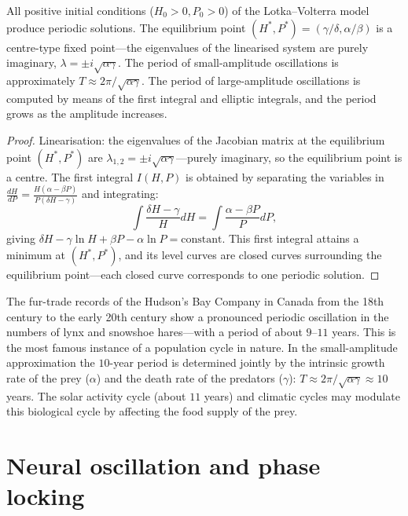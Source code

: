 \begin{theorem}\label{thm:lotka_volterra_periodic}
All positive initial conditions ($H_0 > 0, P_0 > 0$) of the Lotka--Volterra model produce periodic solutions. The equilibrium point $(H^*, P^*) = (\gamma/\delta, \alpha/\beta)$ is a centre-type fixed point---the eigenvalues of the linearised system are purely imaginary, $\lambda = \pm i\sqrt{\alpha\gamma}$. The period of small-amplitude oscillations is approximately $T \approx 2\pi/\sqrt{\alpha\gamma}$. The period of large-amplitude oscillations is computed by means of the first integral and elliptic integrals, and the period grows as the amplitude increases.
\end{theorem}

\begin{proof}
Linearisation: the eigenvalues of the Jacobian matrix at the equilibrium point $(H^*, P^*)$ are $\lambda_{1,2} = \pm i\sqrt{\alpha\gamma}$---purely imaginary, so the equilibrium point is a centre. The first integral $I(H, P)$ is obtained by separating the variables in $\frac{dH}{dP} = \frac{H(\alpha - \beta P)}{P(\delta H - \gamma)}$ and integrating:
\[
\int \frac{\delta H - \gamma}{H} dH = \int \frac{\alpha - \beta P}{P} dP,
\]
giving $\delta H - \gamma \ln H + \beta P - \alpha \ln P = \text{constant}$. This first integral attains a minimum at $(H^*, P^*)$, and its level curves are closed curves surrounding the equilibrium point---each closed curve corresponds to one periodic solution.
\end{proof}

\begin{example}
The fur-trade records of the Hudson's Bay Company in Canada from the 18th century to the early 20th century show a pronounced periodic oscillation in the numbers of lynx and snowshoe hares---with a period of about $9$--$11$ years. This is the most famous instance of a population cycle in nature. In the small-amplitude approximation the $10$-year period is determined jointly by the intrinsic growth rate of the prey ($\alpha$) and the death rate of the predators ($\gamma$): $T \approx 2\pi/\sqrt{\alpha\gamma} \approx 10$ years. The solar activity cycle (about $11$ years) and climatic cycles may modulate this biological cycle by affecting the food supply of the prey.
\end{example}

\section{Neural oscillation and phase locking}

